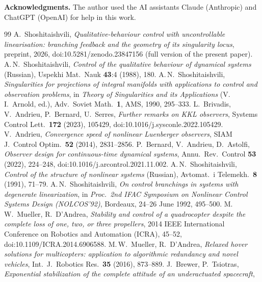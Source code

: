 \documentclass[11pt,reqno]{amsart}
\theoremstyle{plain}
\theoremstyle{remark}
\theoremstyle{definition}
\begin{document}
\medskip
\noindent\textbf{Acknowledgments.} The author used the AI assistants Claude (Anthropic) and ChatGPT (OpenAI) for help in this work.

{\small
\begin{thebibliography}{99}
 A.~Shoshitaishvili,
  \emph{Qualitative-behaviour control with uncontrollable linearisation: branching feedback and the geometry of
  its singularity locus}, preprint, 2026, doi:10.5281/zenodo.23847156 (full version of the present paper).
 A.\,N.~Shoshitaishvili,
  \emph{Control of the qualitative behaviour of dynamical systems}
  \textup{(Russian)}, Uspekhi Mat.\ Nauk \textbf{43}:4 (1988), 180.
 A.\,N.~Shoshitaishvili,
  \emph{Singularities for projections of integral manifolds with applications to
  control and observation problems}, in \emph{Theory of Singularities and its
  Applications} (V.\,I.~Arnold, ed.), Adv.\ Soviet Math.\ \textbf{1}, AMS, 1990, 295--333.
 L.~Brivadis, V.~Andrieu, P.~Bernard, U.~Serres,
  \emph{Further remarks on KKL observers}, Systems Control Lett.\ \textbf{172} (2023), 105429,
  doi:10.1016/j.sysconle.2022.105429.
 V.~Andrieu,
  \emph{Convergence speed of nonlinear Luenberger observers},
  SIAM J.\ Control Optim.\ \textbf{52} (2014), 2831--2856.
 P.~Bernard, V.~Andrieu, D.~Astolfi,
  \emph{Observer design for continuous-time dynamical systems}, Annu.\ Rev.\ Control \textbf{53} (2022),
  224--248, doi:10.1016/j.arcontrol.2021.11.002.
 A.\,N.~Shoshitaishvili,
  \emph{Control of the structure of nonlinear systems} \textup{(Russian)},
  Avtomat.\ i Telemekh.\ \textbf{8} (1991), 71--79.
 A.\,N.~Shoshitaishvili,
  \emph{On control branchings in systems with degenerate linearization},
  in \emph{Proc.\ 2nd IFAC Symposium on Nonlinear Control Systems Design (NOLCOS'92)}, Bordeaux,
  24--26 June 1992, 495--500.
 M.\,W.~Mueller, R.~D'Andrea,
  \emph{Stability and control of a quadrocopter despite the complete loss of one, two, or three
  propellers}, 2014 IEEE International Conference on Robotics and Automation (ICRA), 45--52,
  doi:10.1109/ICRA.2014.6906588.
 M.\,W.~Mueller, R.~D'Andrea,
  \emph{Relaxed hover solutions for multicopters: application to algorithmic redundancy and novel
  vehicles}, Int.\ J.\ Robotics Res.\ \textbf{35} (2016), 873--889.
 J.~Brewer, P.~Tsiotras,
  \emph{Exponential stabilization of the complete attitude of an underactuated spacecraft},

\end{thebibliography}}
\end{document}
